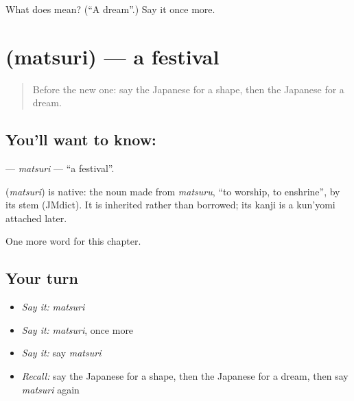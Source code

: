 \begin{tcolorbox}[breakable,colback=teal!4,colframe=teal!35!black,title={Before you move on}]
What does  mean? (\textquotedblleft{}A dream\textquotedblright{}.) Say it once more.
\end{tcolorbox}
\section[\texorpdfstring{\ja{まつり} (matsuri)}{まつり (matsuri)}]{ (matsuri) — a festival}

\label{lesson:JA-C63-matsuri}



\begin{quote}
Before the new one: say the Japanese for a shape, then the Japanese for a dream.
\end{quote}

\subsection*{You'll want to know: }
\textbf{} — \emph{matsuri} — \textquotedblleft{}a festival\textquotedblright{}.

\begin{cousinweb}
\textbf{} (\emph{matsuri}) is native: the noun made from \emph{matsuru}, \textquotedblleft{}to worship, to enshrine\textquotedblright{}, by its stem (JMdict). It is inherited rather than borrowed; its kanji is a kun'yomi attached later.
\end{cousinweb}

\begin{grammarlens}[title={What you've built}]
One more word for this chapter.
\end{grammarlens}

\subsection*{Your turn}
\begin{itemize}
\raggedright
  \item \emph{Say it:} \emph{matsuri}
  \item \emph{Say it:} \emph{matsuri}, once more
  \item \emph{Say it:} say \emph{matsuri}
  \item \emph{Recall:} say the Japanese for a shape, then the Japanese for a dream, then say \emph{matsuri} again
\end{itemize}

